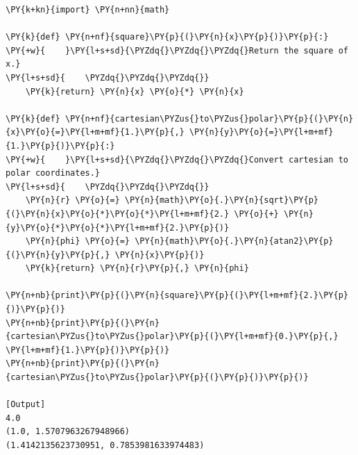 \begin{Verbatim}[label=\makebox{\url{https://github.com/lucabaldini/cmepda/tree/master/slides/latex/snippets/func1.py}},commandchars=\\\{\}]
\PY{k+kn}{import} \PY{n+nn}{math}

\PY{k}{def} \PY{n+nf}{square}\PY{p}{(}\PY{n}{x}\PY{p}{)}\PY{p}{:}
\PY{+w}{    }\PY{l+s+sd}{\PYZdq{}\PYZdq{}\PYZdq{}Return the square of x.}
\PY{l+s+sd}{    \PYZdq{}\PYZdq{}\PYZdq{}}
    \PY{k}{return} \PY{n}{x} \PY{o}{*} \PY{n}{x}

\PY{k}{def} \PY{n+nf}{cartesian\PYZus{}to\PYZus{}polar}\PY{p}{(}\PY{n}{x}\PY{o}{=}\PY{l+m+mf}{1.}\PY{p}{,} \PY{n}{y}\PY{o}{=}\PY{l+m+mf}{1.}\PY{p}{)}\PY{p}{:}
\PY{+w}{    }\PY{l+s+sd}{\PYZdq{}\PYZdq{}\PYZdq{}Convert cartesian to polar coordinates.}
\PY{l+s+sd}{    \PYZdq{}\PYZdq{}\PYZdq{}}
    \PY{n}{r} \PY{o}{=} \PY{n}{math}\PY{o}{.}\PY{n}{sqrt}\PY{p}{(}\PY{n}{x}\PY{o}{*}\PY{o}{*}\PY{l+m+mf}{2.} \PY{o}{+} \PY{n}{y}\PY{o}{*}\PY{o}{*}\PY{l+m+mf}{2.}\PY{p}{)}
    \PY{n}{phi} \PY{o}{=} \PY{n}{math}\PY{o}{.}\PY{n}{atan2}\PY{p}{(}\PY{n}{y}\PY{p}{,} \PY{n}{x}\PY{p}{)}
    \PY{k}{return} \PY{n}{r}\PY{p}{,} \PY{n}{phi}

\PY{n+nb}{print}\PY{p}{(}\PY{n}{square}\PY{p}{(}\PY{l+m+mf}{2.}\PY{p}{)}\PY{p}{)}
\PY{n+nb}{print}\PY{p}{(}\PY{n}{cartesian\PYZus{}to\PYZus{}polar}\PY{p}{(}\PY{l+m+mf}{0.}\PY{p}{,} \PY{l+m+mf}{1.}\PY{p}{)}\PY{p}{)}
\PY{n+nb}{print}\PY{p}{(}\PY{n}{cartesian\PYZus{}to\PYZus{}polar}\PY{p}{(}\PY{p}{)}\PY{p}{)}

[Output]
4.0
(1.0, 1.5707963267948966)
(1.4142135623730951, 0.7853981633974483)
\end{Verbatim}